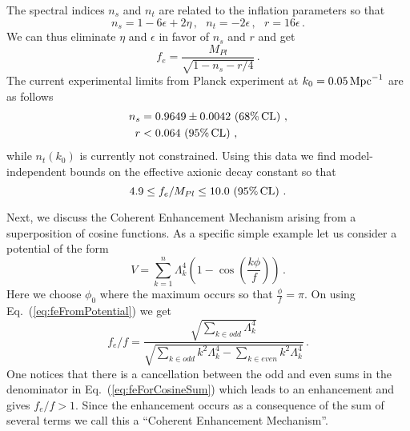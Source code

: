 \documentclass[12pt]{article}
\begin{document}
The spectral indices $n_s$ and $n_t$ are related to the inflation parameters so that
\begin{equation} \label{eq:observablesSlowRoll}
  n_s = 1 - 6 \epsilon + 2 \eta\,,
  ~~~ n_t = -2 \epsilon\,,
  ~~~ r = 16 \epsilon\,.
\end{equation}
We can thus eliminate $\eta$ and $\epsilon$ in favor of $n_s$ and $r$ and get
\begin{equation} \label{eq:feSpectralIndices}
  f_e = \frac{M_{Pl}}{\sqrt{1 - n_s - r / 4}}\,.
\end{equation}
The current experimental limits from Planck experiment at $k_0 = 0.05\,{\rm Mpc}^{-1}$ are as follows~\cite{Akrami:2018vks, Akrami:2018odb, Array:2015xqh}
\begin{equation} \label{data}
  \begin{aligned}
    n_s &= 0.9649 \pm 0.0042\, \left(68\%\, {\rm CL}\right)\,,\\
      r &< 0.064\, \left(95\%\, {\rm CL}\right)\,,
  \end{aligned}
\end{equation}
while $n_t\left(k_0\right)$ is currently not constrained.
Using this data we find model-independent bounds on the effective axionic decay constant so that
\begin{equation} \label{eq:feExperimentalConstraint}
  4.9 \leq f_e / M_{Pl} \leq 10.0\, \left(95\%\, {\rm CL}\right)\,.
\end{equation}

Next, we discuss the Coherent Enhancement Mechanism arising from a superposition of cosine functions.
As a specific simple example let us consider a potential of the form
\begin{equation} \label{eq:cosineSumPotential}
  V = \sum_{k = 1}^n \Lambda_k^4 \left(1 - \cos\left(\frac{k\phi}{f}\right)\right)\,.
\end{equation}
Here we choose $\phi_0$ where the maximum occurs so that $\frac{\phi}{f} = \pi$.
On using Eq.~(\ref{eq:feFromPotential}) we get
\begin{equation} \label{eq:feForCosineSum}
  {f_e} / f = \frac
    {\sqrt{\sum_{k \in odd} \Lambda_k^4}}
    {\sqrt{\sum_{k \in odd} k^2 \Lambda_k^4 - \sum_{k \in even} k^2 \Lambda_k^4}}\,.
\end{equation}
One notices that there is a cancellation between the odd and even sums in the denominator in Eq.~(\ref{eq:feForCosineSum}) which leads to an enhancement and gives $f_e / f > 1$.
Since the enhancement occurs as a consequence of the sum of several terms we call this a ``Coherent Enhancement Mechanism''.
\end{document}
